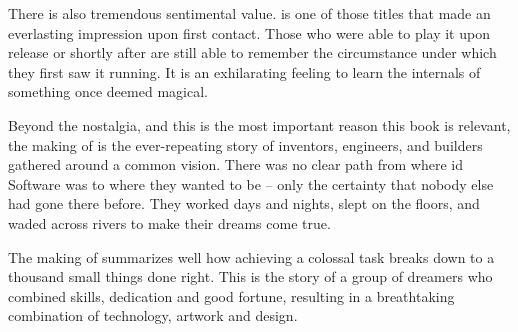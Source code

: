  \par

There is also tremendous sentimental value. \doom{} is one of those titles that made an everlasting impression upon first contact. Those who were able to play it upon release or shortly after are still able to remember the circumstance under which they first saw it running. It is an exhilarating feeling to learn the internals of something once deemed magical.\\
 \par
 \vspace{-12pt}
Beyond the nostalgia, and this is the most important reason this book is relevant, the making of \doom{} is the ever-repeating story of inventors, engineers, and builders gathered around a common vision. There was no clear path from where id Software was to where they wanted to be -- only the certainty that nobody else had gone there before. They worked days and nights, slept on the floors, and waded across rivers to make their dreams come true.\\
\par
 The making of \doom{} summarizes well how achieving a colossal task breaks down to a thousand small things done right. This is the story of a group of dreamers who combined skills, dedication and good fortune, resulting in a breathtaking combination of technology, artwork and design.\\
\par



